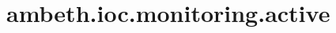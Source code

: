 \section{ambeth.ioc.monitoring.active}
\label{configuration:AmbethIocMonitoringActive}
\AvailableInCsharpOnly{\TODO}